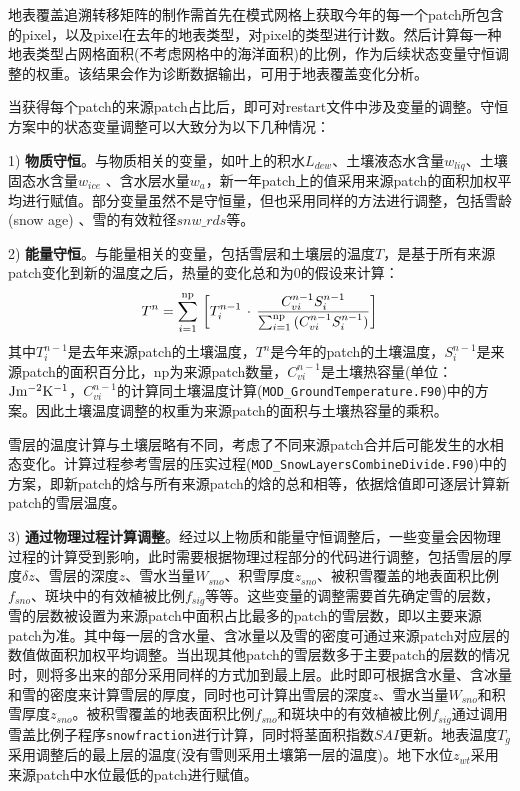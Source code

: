 地表覆盖追溯转移矩阵的制作需首先在模式网格上获取今年的每一个patch所包含的pixel，以及pixel在去年的地表类型，对pixel的类型进行计数。然后计算每一种地表类型占网格面积(不考虑网格中的海洋面积)的比例，作为后续状态变量守恒调整的权重。该结果会作为诊断数据输出，可用于地表覆盖变化分析。

当获得每个patch的来源patch占比后，即可对restart文件中涉及变量的调整。守恒方案中的状态变量调整可以大致分为以下几种情况：


1) \textbf{物质守恒}。与物质相关的变量，如叶上的积水$L_{dew}$、土壤液态水含量$w_{liq}$、土壤固态水含量$w_{ice}$
、含水层水量$w_{a}$，新一年patch上的值采用来源patch的面积加权平均进行赋值。部分变量虽然不是守恒量，但也采用同样的方法进行调整，包括雪龄 (snow age) 、雪的有效粒径$snw\_rds$等。

2) \textbf{能量守恒}。与能量相关的变量，包括雪层和土壤层的温度$T$，是基于所有来源patch变化到新的温度之后，热量的变化总和为0的假设来计算：
\begin{equation}
T^{n} = \sum_{i = 1}^{\rm np}{\,\left[ T_{i}^{n - 1}\,\cdot\,\frac{C_{vi}^{n - 1} S_{i}^{n - 1}}{\sum_{i = 1}^{\rm np}{(C_{vi}^{n - 1} S_{i}^{n - 1})}}\right]}
\end{equation}
其中\(T_{i}^{n - 1}\)是去年来源patch的土壤温度，\(T^{n}\)是今年的patch的土壤温度，\(S_{i}^{n - 1}\)是来源patch的面积百分比，np为来源patch数量，\(C_{vi}^{n - 1}\)是土壤热容量(单位：\( \rm Jm^{-2}K^{-1}\)，\(C_{vi}^{n - 1}\)的计算同土壤温度计算(\texttt{MOD\_GroundTemperature.F90})中的方案。因此土壤温度调整的权重为来源patch的面积与土壤热容量的乘积。

雪层的温度计算与土壤层略有不同，考虑了不同来源patch合并后可能发生的水相态变化。计算过程参考雪层的压实过程(\texttt{MOD\_SnowLayersCombineDivide.F90})中的方案，即新patch的焓与所有来源patch的焓的总和相等，依据焓值即可逐层计算新patch的雪层温度。

3) \textbf{通过物理过程计算调整}。经过以上物质和能量守恒调整后，一些变量会因物理过程的计算受到影响，此时需要根据物理过程部分的代码进行调整，包括雪层的厚度$\delta z$、雪层的深度$z$、雪水当量$W_{sno}$、积雪厚度$z_{sno}$、被积雪覆盖的地表面积比例$f_{sno}$、斑块中的有效植被比例$f_{sig}$等等。这些变量的调整需要首先确定雪的层数，雪的层数被设置为来源patch中面积占比最多的patch的雪层数，即以主要来源patch为准。其中每一层的含水量、含冰量以及雪的密度可通过来源patch对应层的数值做面积加权平均调整。当出现其他patch的雪层数多于主要patch的层数的情况时，则将多出来的部分采用同样的方式加到最上层。此时即可根据含水量、含冰量和雪的密度来计算雪层的厚度，同时也可计算出雪层的深度$z$、雪水当量$W_{sno}$和积雪厚度$z_{sno}$。被积雪覆盖的地表面积比例$f_{sno}$和斑块中的有效植被比例$f_{sig}$通过调用雪盖比例子程序\texttt{snowfraction}进行计算，同时将茎面积指数$SAI$更新。地表温度$T_{g}$采用调整后的最上层的温度(没有雪则采用土壤第一层的温度)。地下水位$z_{wt}$采用来源patch中水位最低的patch进行赋值。


